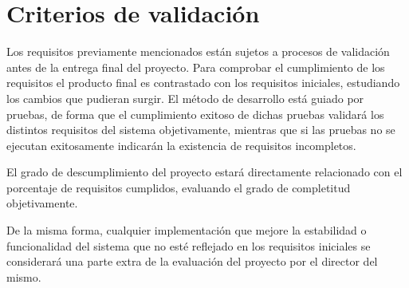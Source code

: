 \section{Criterios de validación}

	Los requisitos previamente mencionados están sujetos a procesos de validación antes de la entrega final del proyecto. Para comprobar el cumplimiento de los requisitos el producto final es contrastado con los requisitos iniciales, estudiando los cambios que pudieran surgir. El método de desarrollo está guiado por pruebas, de forma que el cumplimiento exitoso de dichas pruebas validará los distintos requisitos del sistema objetivamente, mientras que si las pruebas no se ejecutan exitosamente indicarán la existencia de requisitos incompletos.

	El grado de descumplimiento del proyecto estará directamente relacionado con el porcentaje de requisitos cumplidos, evaluando el grado de completitud objetivamente.

	De la misma forma, cualquier implementación que mejore la estabilidad o funcionalidad del sistema que no esté reflejado en los requisitos iniciales se considerará una parte extra de la evaluación del proyecto por el director del mismo.